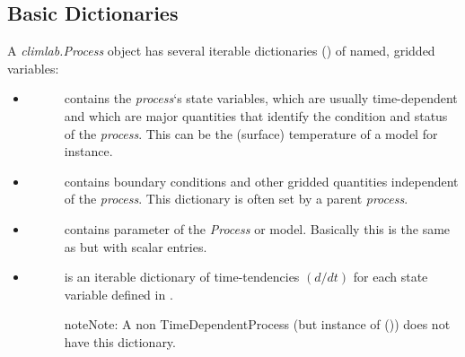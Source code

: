 \documentclass[a4paper,10pt,english]{sphinxmanual}
\begin{document}
\subsection{Basic Dictionaries}
\label{architecture:basic-dictionaries}
A \emph{climlab.Process} object has several iterable dictionaries (\href{http://docs.python.org/2.7/library/stdtypes.html\#dict}{}) of named, gridded variables:
\begin{itemize}
\item {} \begin{description}
\item[{}] \leavevmode
contains the \emph{process}`s state variables, which are usually time-dependent and which are major quantities that identify the condition and status of the \emph{process}. This can be the (surface) temperature of a model for instance.

\end{description}

\item {} \begin{description}
\item[{}] \leavevmode
contains boundary conditions and other gridded quantities independent of the \emph{process}. This dictionary is often set by a parent \emph{process}.

\end{description}

\item {} \begin{description}
\item[{}] \leavevmode
contains parameter of the \emph{Process} or model. Basically this is the same as  but with scalar entries.

\end{description}

\item {} \begin{description}
\item[{}] \leavevmode
is an iterable dictionary of time-tendencies \((d/dt)\) for each state variable defined in .

\begin{notice}{note}{Note:}
A non TimeDependentProcess (but instance of {\hyperref[api/climlab.process:climlab.process.process.Process]{\emph{}}} ()) does not have this dictionary.
\end{notice}


\end{description}
\end{itemize}
\end{document}
